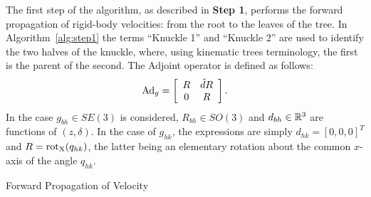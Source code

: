 The first step of the algorithm, as described in \textbf{Step 1}, performs the forward propagation of rigid-body velocities: from the root to the leaves of the tree.
In Algorithm~\ref{alg:step1} the terms ``Knuckle 1'' and ``Knuckle 2'' are used to identify the two halves of the knuckle, where, using kinematic trees terminology, the first is the parent of the second.
The Adjoint operator is defined as follows:
\begin{equation}\label{eq:Adjoint} \Ad_{g}=\left[\begin{array}{cc}R&\hat{d}R\\0&R\end{array}\right].
\end{equation}
In the case $g_{bh}\in SE(3)$ is considered, $R_{bh}\in SO(3)$ and $d_{bh}\in \mathbb{R}^3$ are functions of $(z,\delta)$. In the case of $g_{hk}$, the expressions are simply $d_{hk}=[0,0,0]^T$ and $R = \operatorname{rot_X}(q_{hk})$, the latter being an elementary rotation about the common $x$-axis of the angle $q_{hk}$.

\begin{algorithm}[h]
	\caption{Forward Propagation of Velocity}\label{alg:step1}
	\begin{algorithmic}[1]
		\vspace{1mm}
		\vspace{1mm}
		\vspace{1mm}
		\vspace{1mm}
		\vspace{1mm}
		\vspace{1mm}
		\vspace{1mm}
		\vspace{1mm}
		\EndFor
		\vspace{1mm}
	\end{algorithmic}
\end{algorithm}

